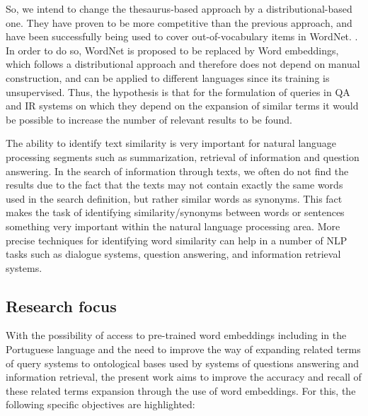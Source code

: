 So, we intend to change the thesaurus-based approach by a distributional-based one. They have proven to be more competitive than the previous approach, and have been successfully being used to cover out-of-vocabulary items in WordNet. \cite{Agirre2009}.
In order to do so, WordNet is proposed to be replaced by Word embeddings, which follows a distributional approach and therefore does not depend on manual construction, and can be applied to different languages since its training is unsupervised. Thus, the hypothesis is that for the formulation of queries in QA and IR systems on which they depend on the expansion of similar terms it would be possible to increase the number of relevant results to be found.

The ability to identify text similarity is very important for natural language processing segments such as summarization, retrieval of information and question answering. In the search of information through texts, we often do not find the results due to the fact that the texts may not contain exactly the same words used in the search definition, but rather similar words as synonyms. This fact makes the task of identifying similarity/synonyms between words or sentences something very important within the natural language processing area. More precise techniques for identifying word similarity can help in a number of NLP tasks such as dialogue systems, question answering, and information retrieval systems. \cite{Islam2007ApplicationsOC, Pilehvar2013, Agirre2009}


\subsection{Research focus}

With the possibility of access to pre-trained word embeddings including in the Portuguese language and the need to improve the way of expanding related terms of query systems to ontological bases used by systems of questions answering and information retrieval, the present work aims to improve the accuracy and recall of these related terms expansion through the use of word embeddings. For this, the following specific objectives are highlighted:

